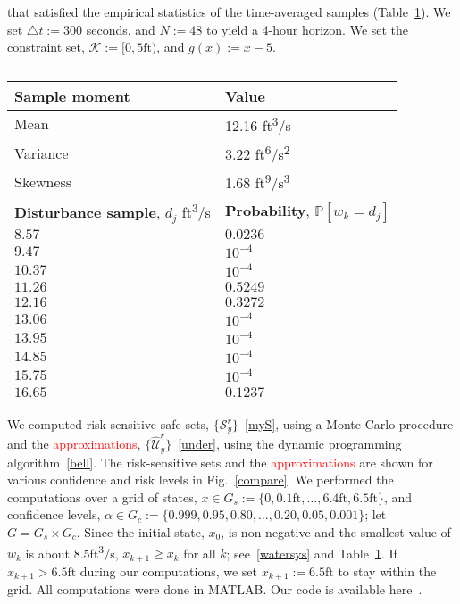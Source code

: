 \documentclass[letterpaper, 10 pt, conference]{ieeeconf}  %
\begin{document}
that satisfied the empirical statistics of the time-averaged samples (Table~\ref{dist}). 
We set $\triangle t := 300$ seconds, and $N := 48$ to yield a 4-hour horizon.
We set the constraint set, $\mathcal{K} := [0, 5\text{ft})$, and $g(x) := x - 5$.
%
\begin{table}
\begin{center}
\caption{}
\begin{tabular}{| p{3.5cm} | p{3.5cm} |}
\hline
\bf{Sample moment} & \bf{Value}  \\ \hline
Mean & 12.16 ft\textsuperscript{3}/s \\ 
Variance & 3.22 ft\textsuperscript{6}/s\textsuperscript{2} \\ 
Skewness & 1.68 ft\textsuperscript{9}/s\textsuperscript{3} \\ 
\hline 
\textbf{Disturbance sample}, $d_j$ ft\textsuperscript{3}/s & \textbf{Probability}, $\mathbb{P}[w_k = d_j]$ \\ \hline
$8.57$ 		& $0.0236$ \\
$9.47$ 		& $10^{-4}$ \\
$10.37$ 		& $10^{-4}$ \\
$11.26$  & $0.5249$ \\ 
$12.16$ & $0.3272$ \\ 
$13.06$  & $10^{-4}$ \\ 
$13.95$  & $10^{-4}$ \\ 
$14.85$  & $10^{-4}$ \\ 
$15.75$  & $10^{-4}$ \\ 
$16.65$  & $0.1237$ \\ \hline
\end{tabular}
\begin{flushleft} \end{flushleft}
\label{dist}
\end{center}
\end{table}
%
We computed risk-sensitive safe sets, $\{\mathcal{S}_y^r\}$~\eqref{myS}, using a Monte Carlo procedure 
and the \textcolor{red}{approximations}, $\{\widehat{\mathcal{U}}_y^r\}$~\eqref{under}, using the dynamic programming algorithm~\eqref{bell}.
The risk-sensitive sets and the \textcolor{red}{approximations} are shown for various confidence and risk levels in Fig.~\ref{compare}.
We performed the computations over a grid of states, $x \in G_s := \{0, 0.1\text{ft}, \dots, 6.4\text{ft}, 6.5\text{ft}\}$,
and confidence levels, $\alpha \in G_c := \{0.999, 0.95, 0.80, \dots, 0.20, 0.05, 0.001\}$; let $G = G_s \times G_c$.
Since the initial state, $x_0$, is non-negative and the smallest value of $w_k$ is about 8.5ft\textsuperscript{3}/s, 
$x_{k+1}\geq x_k$ for all $k$; see~\eqref{watersys} and Table~\ref{dist}. 
If $x_{k+1} > 6.5\text{ft}$ during our computations, we set $x_{k+1} := 6.5\text{ft}$ to stay within the grid.
All computations were done in MATLAB.\footnotemark 
{}
Our code is available here~\cite{mycode}.
\end{document}
